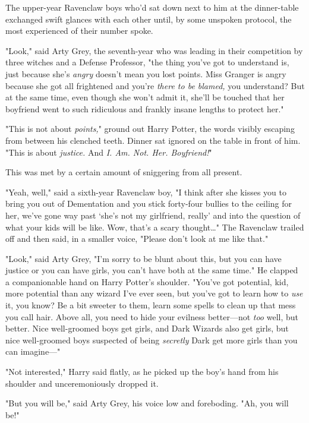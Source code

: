 The upper-year Ravenclaw boys who'd sat down next to him at the dinner-table
exchanged swift glances with each other until, by some unspoken protocol, the
most experienced of their number spoke.

"Look," said Arty Grey, the seventh-year who was leading in their competition
by three witches and a Defense Professor, "the thing you've got to understand
is, just because she's \emph{angry} doesn't mean you lost points. Miss Granger
is angry because she got all frightened and you're \emph{there to be blamed,}
you understand? But at the same time, even though she won't admit it, she'll be
touched that her boyfriend went to such ridiculous and frankly insane lengths
to protect her."

"This is not about \emph{points,}" ground out Harry Potter, the words visibly
escaping from between his clenched teeth. Dinner sat ignored on the table in
front of him. "This is about \emph{justice.} And \emph{I. Am. Not. Her.
Boyfriend!}"

This was met by a certain amount of sniggering from all present.

"Yeah, well," said a sixth-year Ravenclaw boy, "I think after she kisses you to
bring you out of Dementation and you stick forty-four bullies to the ceiling
for her, we've gone way past `she's not my girlfriend, really' and into the
question of what your kids will be like. Wow, that's a scary thought{\ldots}"
The Ravenclaw trailed off and then said, in a smaller voice, "Please don't look
at me like that."

"Look," said Arty Grey, "I'm sorry to be blunt about this, but you can have
justice or you can have girls, you can't have both at the same time." He
clapped a companionable hand on Harry Potter's shoulder. "You've got potential,
kid, more potential than any wizard I've ever seen, but you've got to learn how
to \emph{use} it, you know? Be a bit sweeter to them, learn some spells to
clean up that mess you call hair. Above all, you need to hide your evilness
better---not \emph{too} well, but better. Nice well-groomed boys get girls, and
Dark Wizards also get girls, but nice well-groomed boys suspected of being
\emph{secretly} Dark get more girls than you can imagine---"

"Not interested," Harry said flatly, as he picked up the boy's hand from his
shoulder and unceremoniously dropped it.

"But you will be," said Arty Grey, his voice low and foreboding. "Ah, you will
be!"

